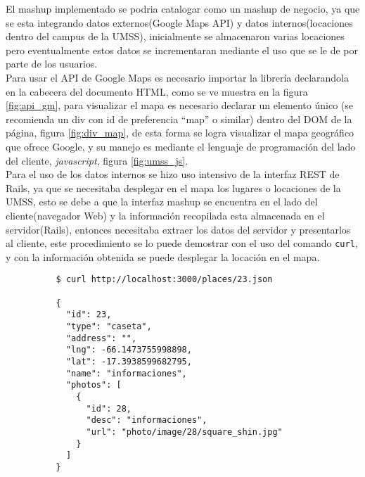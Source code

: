       El mashup implementado se podria catalogar como un mashup de negocio, ya que
      se esta integrando datos externos(Google Maps API) y datos internos(locaciones dentro del campus de la UMSS),
      inicialmente se almacenaron varias locaciones pero eventualmente estos datos
      se incrementaran mediante el uso que se le de por parte de los usuarios.\\


         
      Para usar el API de Google Maps es necesario importar la librería 
      declarandola en la cabecera del documento HTML, como se ve muestra en la 
      figura \ref{fig:api_gm}, para visualizar el mapa es 
      necesario declarar un elemento único (se recomienda un div con id de 
      preferencia ``map'' o similar) dentro del DOM de la página, figura 
      \ref{fig:div_map}, de esta forma se      logra visualizar el mapa 
      geográfico que ofrece Google, y su manejo es  mediante el lenguaje de 
      programación del lado      del cliente, \emph{javascript}, figura \ref{fig:umss_js}.\\

      Para el uso de los datos internos se hizo uso intensivo de la interfaz 
      REST de Rails, ya que se necesitaba desplegar en el mapa los lugares o locaciones
      de la UMSS, esto se debe a que la interfaz mashup se encuentra en el 
      lado del cliente(navegador Web) y la informaci\'on recopilada esta 
      almacenada en el servidor(Rails), entonces necesitaba extraer los datos del servidor y presentarlos al cliente, este procedimiento se lo puede demostrar con el uso del comando \verb|curl|, y con la informaci\'on obtenida se puede desplegar la locaci\'on en el mapa.\\

      \begin{center}
        \begin{verbatim}
          $ curl http://localhost:3000/places/23.json

          {
            "id": 23,
            "type": "caseta",
            "address": "",
            "lng": -66.1473755998898,
            "lat": -17.3938599682795,
            "name": "informaciones",
            "photos": [
              {
                "id": 28,
                "desc": "informaciones",
                "url": "photo/image/28/square_shin.jpg"
              }
            ]
          }
        \end{verbatim}
      \end{center}

